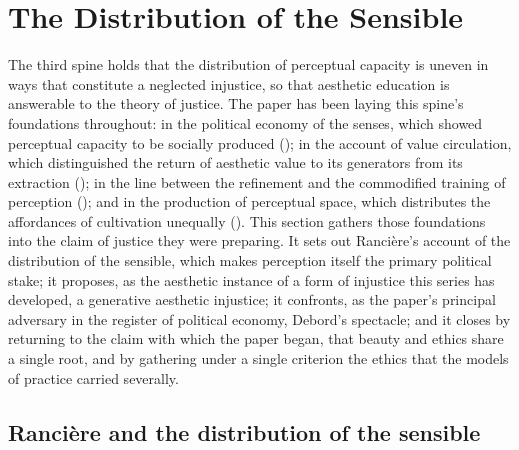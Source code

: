 \section{The Distribution of the Sensible}
\label{p23:sec:distribution}

\noindent
The third spine holds that the distribution of perceptual capacity is uneven in ways that constitute a neglected injustice, so that aesthetic education is answerable to the theory of justice. The paper has been laying this spine's foundations throughout: in the political economy of the senses, which showed perceptual capacity to be socially produced (); in the account of value circulation, which distinguished the return of aesthetic value to its generators from its extraction (); in the line between the refinement and the commodified training of perception (); and in the production of perceptual space, which distributes the affordances of cultivation unequally (). This section gathers those foundations into the claim of justice they were preparing. It sets out Ranci\`ere's account of the distribution of the sensible, which makes perception itself the primary political stake; it proposes, as the aesthetic instance of a form of injustice this series has developed, a generative aesthetic injustice; it confronts, as the paper's principal adversary in the register of political economy, Debord's spectacle; and it closes by returning to the claim with which the paper began, that beauty and ethics share a single root, and by gathering under a single criterion the ethics that the models of practice carried severally.

\subsection{Rancière and the distribution of the sensible}
\label{p23:sub:dist-ranciere}

